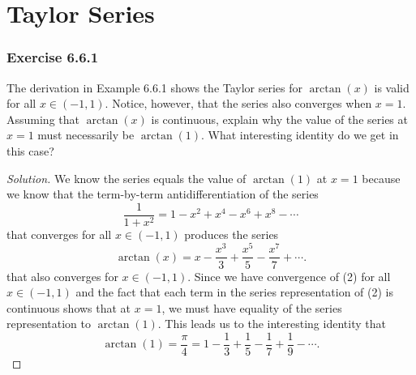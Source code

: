 \section{Taylor Series}
\subsubsection{Exercise 6.6.1} The derivation in Example 6.6.1 shows the Taylor series for \( \arctan(x)  \) is valid for all \(  x \in (-1,1) \). Notice, however, that the series also converges when \( x =1  \). Assuming that \( \arctan(x)  \) is continuous, explain why the value of the series at \( x = 1  \) must necessarily be \( \arctan(1)  \). What interesting identity do we get in this case?
\begin{proof}[Solution]
We know the series equals the value of \( \arctan(1) \) at \( x = 1  \) because we know that the term-by-term antidifferentiation of the series
\[  \frac{ 1 }{ 1 + x^2  } = 1 - x^{2} + x^{4} - x^{6} + x^{8} - \dotsb  \tag{1}\]
that converges for all \( x \in (-1,1)  \) produces the series 
\[  \arctan(x) = x - \frac{ x^{3} }{ 3  } + \frac{ x^{5} }{ 5 } - \frac{ x^{7} }{ 7 } + \dotsb .  \tag{2}\]
that also converges for \( x \in (-1 ,1 ) \). Since we have convergence of (2) for all \( x \in (-1,1) \) and the fact that each term in the series representation of (2) is continuous shows that at \( x = 1  \), we must have equality of the series representation to \( \arctan(1)  \). This leads us to the interesting identity that 
\[  \arctan(1) = \frac{ \pi  }{ 4 }  = 1 - \frac{ 1 }{ 3 } + \frac{ 1 }{ 5 }  - \frac{ 1 }{ 7 }  + \frac{ 1 }{ 9 } - \dotsb . \]
\end{proof}

